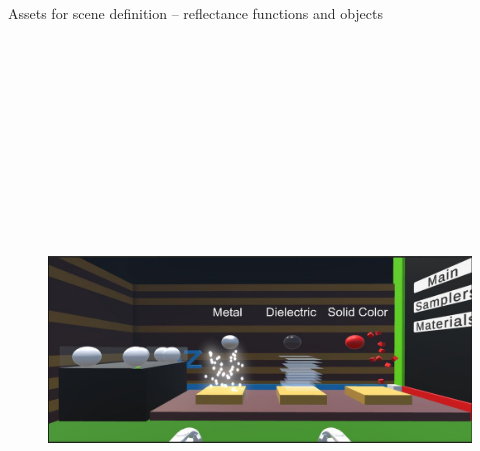 \documentclass[final,hyperref={pdfpagelabels=false}]{beamer}
\begin{document}
\begin{frame}[t]
\begin{columns}[t]
\begin{column}{.4675\textwidth}
\begin{block}{Assets for scene definition -- reflectance functions and objects}
\begin{figure}
        \includegraphics[height=16.5cm]{sphereCreating}
    \end{figure}


    



\end{block}
\end{column}
\end{columns}
\end{frame}
\end{document}
